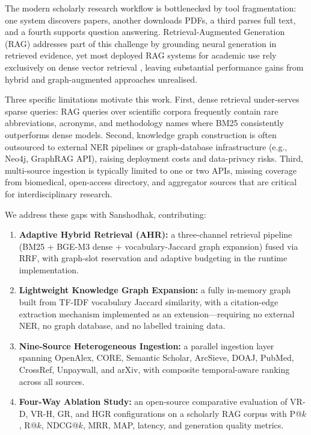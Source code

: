 \documentclass[conference,10pt,twocolumn]{IEEEtran}
\begin{document}
The modern scholarly research workflow is bottlenecked by tool fragmentation: one system discovers papers, another downloads PDFs, a third parses full text, and a fourth supports question answering. Retrieval-Augmented Generation (RAG) \cite{lewis2020rag} addresses part of this challenge by grounding neural generation in retrieved evidence, yet most deployed RAG systems for academic use rely exclusively on dense vector retrieval \cite{karpukhin2020dpr}, leaving substantial performance gains from hybrid and graph-augmented approaches unrealised.

Three specific limitations motivate this work. First, dense retrieval under-serves sparse queries: RAG queries over scientific corpora frequently contain rare abbreviations, acronyms, and methodology names where BM25 \cite{robertson2009bm25} consistently outperforms dense models. Second, knowledge graph construction is often outsourced to external NER pipelines or graph-database infrastructure (e.g., Neo4j, GraphRAG API), raising deployment costs and data-privacy risks. Third, multi-source ingestion is typically limited to one or two APIs, missing coverage from biomedical, open-access directory, and aggregator sources that are critical for interdisciplinary research.

We address these gaps with Sanshodhak, contributing:
\begin{enumerate}
  \item \textbf{Adaptive Hybrid Retrieval (AHR):} a three-channel retrieval pipeline (BM25 + BGE-M3 dense + vocabulary-Jaccard graph expansion) fused via RRF, with graph-slot reservation and adaptive budgeting in the runtime implementation.
  \item \textbf{Lightweight Knowledge Graph Expansion:} a fully in-memory graph built from TF-IDF vocabulary Jaccard similarity, with a citation-edge extraction mechanism implemented as an extension---requiring no external NER, no graph database, and no labelled training data.
  \item \textbf{Nine-Source Heterogeneous Ingestion:} a parallel ingestion layer spanning OpenAlex, CORE, Semantic Scholar, ArcSieve, DOAJ, PubMed, CrossRef, Unpaywall, and arXiv, with composite temporal-aware ranking across all sources.
  \item \textbf{Four-Way Ablation Study:} an open-source comparative evaluation of VR-D, VR-H, GR, and HGR configurations on a scholarly RAG corpus with P@$k$, R@$k$, NDCG@$k$, MRR, MAP, latency, and generation quality metrics.
\end{enumerate}
\end{document}
